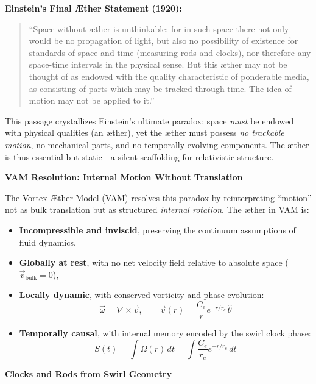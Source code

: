 \documentclass[preprint,notitlepage]{revtex4-2}
\begin{document}
    \noindent
    \textbf{Einstein’s Final Æther Statement (1920):}
    \begin{quote}
        “Space without æther is unthinkable; for in such space there not only would be no propagation of light, but also no possibility of existence for standards of space and time (measuring-rods and clocks), nor therefore any space-time intervals in the physical sense. But this æther may not be thought of as endowed with the quality characteristic of ponderable media, as consisting of parts which may be tracked through time. The idea of motion may not be applied to it.”
    \end{quote}

    \noindent
    This passage crystallizes Einstein’s ultimate paradox: space \emph{must} be endowed with physical qualities (an æther), yet the æther must possess \emph{no trackable motion}, no mechanical parts, and no temporally evolving components. The æther is thus essential but static—a silent scaffolding for relativistic structure.

    \vspace{0.5em}
    \noindent
    \textbf{VAM Resolution: Internal Motion Without Translation}

    The Vortex Æther Model (VAM) resolves this paradox by reinterpreting “motion” not as bulk translation but as structured \emph{internal rotation}. The æther in VAM is:
    \begin{itemize}
        \item \textbf{Incompressible and inviscid}, preserving the continuum assumptions of fluid dynamics,
        \item \textbf{Globally at rest}, with no net velocity field relative to absolute space (\( \vec{v}_{\text{bulk}} = 0 \)),
        \item \textbf{Locally dynamic}, with conserved vorticity and phase evolution:
        \[
            \vec{\omega} = \nabla \times \vec{v}, \qquad \vec{v}(r) = \frac{C_e}{r} e^{-r/r_c} \, \hat{\theta}
        \]
        \item \textbf{Temporally causal}, with internal memory encoded by the swirl clock phase:
        \[
            S(t) = \int \Omega(r) \, dt = \int \frac{C_e}{r_c} e^{-r/r_c} \, dt
        \]
    \end{itemize}

    \vspace{0.5em}
    \noindent
    \textbf{Clocks and Rods from Swirl Geometry}
\end{document}
